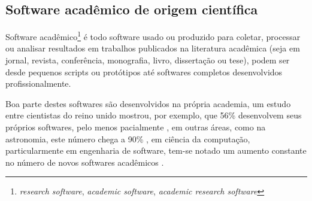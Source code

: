 \subsection{Software acadêmico de origem científica}

%
%
%
%

Software acadêmico\footnote{{\it research software}, {\it academic software},
{\it academic research software}} é todo software usado ou produzido para
coletar, processar ou analisar resultados em trabalhos publicados na literatura
acadêmica (seja em jornal, revista, conferência, monografia, livro, dissertação
ou tese), podem ser desde pequenos scripts ou protótipos até softwares
completos desenvolvidos profissionalmente.

Boa parte destes softwares são desenvolvidos na própria academia, um estudo
entre cientistas do reino unido mostrou, por exemplo, que 56\% desenvolvem seus próprios
softwares, pelo menos pacialmente \cite{hettrick_2014_14809}, em outras áreas,
como na astronomia, este número chega a 90\%
\cite{momcheva2015software}, em ciência da computação, particularmente em
engenharia de software, tem-se notado um aumento constante no número de novos
softwares acadêmicos \cite{allen2017engineering}.
%
%
%


